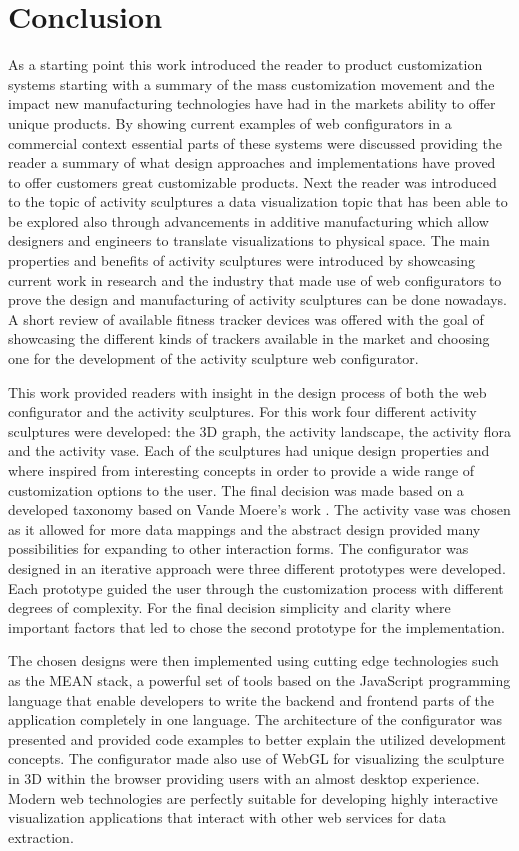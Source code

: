\documentclass[../medieninformatik-arbeit.tex]{subfiles}
\begin{document}
\section{Conclusion}
\label{ch:conclusion}
As a starting point this work introduced the reader to product customization systems starting with a summary of the mass customization movement and the impact new manufacturing technologies have had in the markets ability to offer unique products. By showing current examples of web configurators in a commercial context essential parts of these systems were discussed providing the reader a summary of what design approaches and implementations have proved to offer customers great customizable products. Next the reader was introduced to the topic of activity sculptures a data visualization topic that has been able to be explored also through advancements in additive manufacturing which allow designers and engineers to translate visualizations to physical space. The main properties and benefits of activity sculptures were introduced by showcasing current work in research and the industry that made use of web configurators to prove the design and manufacturing of activity sculptures can be done nowadays. A short review of available fitness tracker devices was offered with the goal of showcasing the different kinds of trackers available in the market and choosing one for the development of the activity sculpture web configurator. 

This work provided readers with insight in the design process of both the web configurator and the activity sculptures. For this work four different activity sculptures were developed: the 3D graph, the activity landscape, the activity flora and the activity vase. Each of the sculptures had unique design properties and where inspired from interesting concepts in order to provide a wide range of customization options to the user. The final decision was made based on a developed taxonomy based on Vande Moere's work \cite{vande2009analyzing}. The activity vase was chosen as it allowed for more data mappings and the abstract design provided many possibilities for expanding to other interaction forms. The configurator was designed in an iterative approach were three different prototypes were developed. Each prototype guided the user through the customization process with different degrees of complexity. For the final decision simplicity and clarity where important factors that led to chose the second prototype for the implementation. 

The chosen designs were then implemented using cutting edge technologies such as the MEAN stack, a powerful set of tools based on the JavaScript programming language that enable developers to write the backend and frontend parts of the application completely in one language. The architecture of the configurator was presented and provided code examples to better explain the utilized development concepts. The configurator made also use of WebGL for visualizing the sculpture in 3D within the browser providing users with an almost desktop experience. Modern web technologies are perfectly suitable for developing highly interactive visualization applications that interact with other web services for data extraction. 
\end{document}
